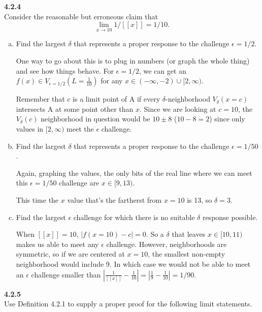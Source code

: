 \textbf{4.2.4}
\\

Consider the reasonable but erroneous claim that
$$
\lim_{x\rightarrow 10} 1/[[x]] = 1/10.
$$

\begin{enumerate}[(a)]
\item Find the largest $\delta$ that represents a proper response to the challenge $\epsilon = 1/2$.

One way to go about this is to plug in numbers (or graph the whole thing) and see how things behave.
For $\epsilon = 1/2$, we can get an $f(x) \in V_{\epsilon=1/2} (L=\frac{1}{10})$ for any $x \in (-\infty, -2) \cup [2, \infty)$.

Remember that $c$ is a limit point of A if every $\delta$-neighborhood
$V_{\delta} (x=c)$ intersects A at some point other than $x$.
Since we are looking at $c=10$, the $V_\delta (c)$ neighborhood in question would be $10 \pm 8$ ($10 - 8 = 2$) since only values in
$[2,\infty)$ meet the $\epsilon$ challenge.

\item Find the largest $\delta$ that represents a proper response to the challenge $\epsilon = 1/50$.

Again, graphing the values, the only bits of the real line where we can meet this $\epsilon = 1/50$ challenge are
$x \in [9, 13)$.

This time the $x$ value that's the fartherst from $x=10$ is 13, so $\delta = 3$.

\item Find the largest $\epsilon$ challenge for which there is no suitable $\delta$ response possible.

When $[[x]] = 10$, $|f(x=10) - c| = 0$.
So a $\delta$ that leaves $x \in [10, 11)$ makes us able to meet any $\epsilon$ challenge.
However, neighborhoods are symmetric, so if we are centered at $x=10$, the smallest non-empty neighborhood would include 9.
In which case we would not be able to meet an $\epsilon$ challenge smaller than
$|\frac{1}{[[x]]} - \frac{1}{10}| = |\frac{1}{9} - \frac{1}{10}| = 1 / 90$.

\end{enumerate}



\textbf{4.2.5}
\\

Use Definition 4.2.1 to supply a proper proof for the following limit statements.

